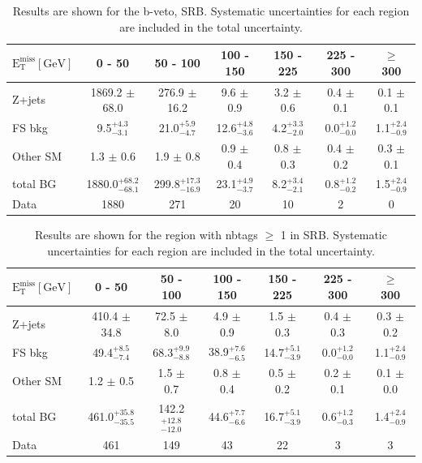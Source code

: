 \begin{table}[htb]
\scriptsize
\begin{center}
\caption{\label{tab:results_bveto_SRB} 
Results are shown for the b-veto, SRB.
Systematic uncertainties for each region are included in the total uncertainty. 
}
\begin{tabular}{l|c|c|c|c|c|c}
\hline
\hline
$\mathrm{E_{T}^{miss} [GeV]}$ &0 - 50 & 50 - 100 & 100 - 150 & 150 - 225 & 225 - 300 & $\geq$ 300 \\
\hline 
Z+jets&  1869.2 $\pm$ 68.0    &  276.9 $\pm$     16.2 &   9.6 $\pm$     0.9 &  3.2 $\pm$      0.6 &  0.4 $\pm$ 0.1 &  0.1 $\pm$ 0.1 \\ 
FS bkg&     9.5$^{+ 4.3}_{- 3.1}$ &   21.0$^{+ 5.9}_{- 4.7}$ &  12.6$^{+ 4.8}_{- 3.6}$ &  4.2$^{+ 3.3}_{- 2.0}$ &  0.0$^{+ 1.2}_{- 0.0}$ &  1.1$^{+ 2.4}_{- 0.9}$ \\ 
Other SM&   1.3 $\pm$ 0.6     &    1.9 $\pm$      0.8 &   0.9 $\pm$     0.4 &  0.8 $\pm$      0.3 &  0.4 $\pm$ 0.2 &  0.3 $\pm$ 0.1 \\ 
\hline 
total BG&  1880.0$^{+ 68.2}_{- 68.1}$ &  299.8$^{+ 17.3}_{- 16.9}$ &  23.1$^{+ 4.9}_{- 3.7}$ &  8.2$^{+ 3.4}_{- 2.1}$ &  0.8$^{+ 1.2}_{- 0.2}$ &  1.5$^{+ 2.4}_{- 0.9}$ \\ 
\hline 
Data&  1880 &  271 &  20 &  10 &  2 &  0 \\ 
\hline
\hline
\end{tabular}
\end{center}
\end{table}


\begin{table}[htb]
\scriptsize
\begin{center}
\caption{\label{tab:results_withb_SRB} 
Results are shown for the region with nbtags $\geq$ 1 in SRB.
Systematic uncertainties for each region are included in the total uncertainty. 
}
\begin{tabular}{l|c|c|c|c|c|c}
\hline
\hline
$\mathrm{E_{T}^{miss} [GeV]}$ &0 - 50 & 50 - 100 & 100 - 150 & 150 - 225 & 225 - 300 & $\geq$ 300 \\
\hline 
Z+jets&  410.4 $\pm$ 34.8 &  72.5 $\pm$ 8.0 &  4.9 $\pm$ 0.9 &  1.5 $\pm$ 0.3 &  0.4 $\pm$ 0.3 &  0.3 $\pm$ 0.2 \\ 
FS bkg&  49.4$^{+ 8.5}_{- 7.4}$ &  68.3$^{+ 9.9}_{- 8.8}$ &  38.9$^{+ 7.6}_{- 6.5}$ &  14.7$^{+ 5.1}_{- 3.9}$ &  0.0$^{+ 1.2}_{- 0.0}$ &  1.1$^{+ 2.4}_{- 0.9}$ \\ 
Other SM&  1.2 $\pm$ 0.5 &  1.5 $\pm$ 0.7 &  0.8 $\pm$ 0.4 &  0.5 $\pm$ 0.2 &  0.2 $\pm$ 0.1 &  0.1 $\pm$ 0.0 \\ 
\hline 
total BG&  461.0$^{+ 35.8}_{- 35.5}$ &  142.2$^{+ 12.8}_{- 12.0}$ &  44.6$^{+ 7.7}_{- 6.6}$ &  16.7$^{+ 5.1}_{- 3.9}$ &  0.6$^{+ 1.2}_{- 0.3}$ &  1.4$^{+ 2.4}_{- 0.9}$ \\ 
\hline 
Data&  461 &  149 &  43 &  22 &  3 &  3 \\ 
\hline
\hline
\end{tabular}
\end{center}
\end{table}


